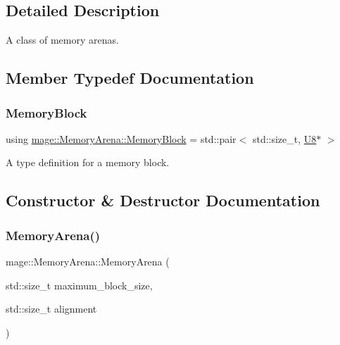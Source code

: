 \subsection{Detailed Description}
A class of memory arenas. 

\subsection{Member Typedef Documentation}
\mbox{\label{classmage_1_1_memory_arena_a2886806e0e4cba357eba84b4b2e729ab}} 
\subsubsection{\texorpdfstring{Memory\+Block}{MemoryBlock}}
{\footnotesize\ttfamily using \mbox{\hyperlink{classmage_1_1_memory_arena_a2886806e0e4cba357eba84b4b2e729ab}{mage\+::\+Memory\+Arena\+::\+Memory\+Block}} =  std\+::pair$<$ std\+::size\+\_\+t, \mbox{\hyperlink{namespacemage_a30677c03d683c4c35630c25f6ff3fb7f}{U8}}$\ast$ $>$\hspace{0.3cm}{\ttfamily [private]}}

A type definition for a memory block. 

\subsection{Constructor \& Destructor Documentation}
\mbox{\label{classmage_1_1_memory_arena_a28b6f4bf491f03b8c5ba8c987c4a4af0}} 
\subsubsection{\texorpdfstring{Memory\+Arena()}{MemoryArena()}\hspace{0.1cm}{\footnotesize\ttfamily [1/3]}}
{\footnotesize\ttfamily mage\+::\+Memory\+Arena\+::\+Memory\+Arena (\begin{DoxyParamCaption}\item[{std\+::size\+\_\+t}]{maximum\+\_\+block\+\_\+size,  }\item[{std\+::size\+\_\+t}]{alignment }\end{DoxyParamCaption})\hspace{0.3cm}{\ttfamily [explicit]}}

